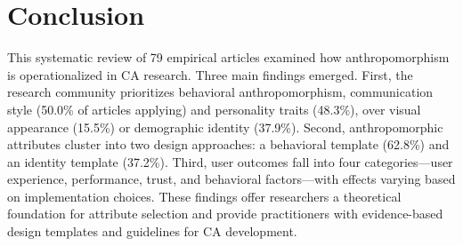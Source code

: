 \documentclass[manuscript,anonymous,sigconf]{acmart}
\begin{document}



\section{Conclusion}

This systematic review of 79 empirical articles examined how anthropomorphism is operationalized in CA research. Three main findings emerged. First, the research community prioritizes behavioral anthropomorphism, communication style (50.0\% of articles applying) and personality traits (48.3\%), over visual appearance (15.5\%) or demographic identity (37.9\%). Second, anthropomorphic attributes cluster into two design approaches: a behavioral template (62.8\%) and an identity template (37.2\%). Third, user outcomes fall into four categories---user experience, performance, trust, and behavioral factors---with effects varying based on implementation choices. These findings offer researchers a theoretical foundation for attribute selection and provide practitioners with evidence-based design templates and guidelines for CA development.



\end{document}
